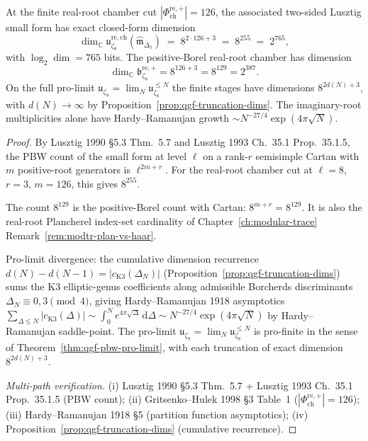 \begin{theorem}
\label{thm:qgf-pbw-closed-126}
At the finite real-root chamber cut
\(|\Phi^{\mathrm{re},+}_{\mathrm{ch}}|=126\), the associated two-sided
Lusztig small form has exact closed-form
dimension
\[
 \boxed{\;
 \dim_{\mathbb C}\mathfrak u_{\zeta_8}^{\mathrm{re},\mathrm{ch}}
 (\widehat{\mathfrak m}_{\Delta_5})
 \;=\;
 8^{2\cdot 126 + 3} \;=\; 8^{255} \;=\; 2^{765},\;}
\]
with $\log_2\dim = 765$ bits. The positive-Borel real-root chamber has
dimension
\[
\dim_{\mathbb C}\mathfrak b_{\zeta_8}^{\mathrm{re},+}
=8^{126+3}=8^{129}=2^{387}.
\]
On the full pro-limit
$\mathfrak u_{\zeta_8} = \lim_N\mathfrak u_{\zeta_8}^{\leq N}$ the
finite stages have dimensions \(8^{2d(N)+3}\), with \(d(N)\to\infty\)
by Proposition~\ref{prop:qgf-truncation-dims}. The imaginary-root
multiplicities alone have Hardy--Ramanujan growth
\(\sim N^{-27/4}\exp(4\pi\sqrt N)\).
\end{theorem}

\begin{proof}
By Lusztig 1990 \S5.3 Thm.~5.7 and Lusztig 1993 Ch.~35.1 Prop.~35.1.5,
the PBW count of the small form at level $\ell$ on a rank-$r$
semisimple Cartan with \(m\) positive-root generators is
\(\ell^{2m+r}\). For the real-root chamber cut at \(\ell=8\),
\(r=3\), \(m=126\), this gives \(8^{255}\).

The count \(8^{129}\) is the positive-Borel count with Cartan:
\(8^{m+r}=8^{129}\). It is also the real-root Plancherel index-set
cardinality of Chapter~\ref{ch:modular-trace}
Remark~\ref{rem:modtr-plan-vs-haar}.

Pro-limit divergence: the cumulative dimension recurrence $d(N) - d(N-1)
= |c_{\mathrm{K3}}(\Delta_N)|$
(Proposition~\ref{prop:qgf-truncation-dims}) sums the K3
elliptic-genus coefficients along admissible Borcherds discriminants
$\Delta_N\equiv 0, 3\pmod 4$, giving Hardy--Ramanujan 1918 asymptotics
$\sum_{\Delta\leq N}|c_{\mathrm{K3}}(\Delta)|\sim \int_0^N
e^{4\pi\sqrt\Delta}\,\mathrm d\Delta \sim N^{-27/4}\exp(4\pi\sqrt N)$
by Hardy--Ramanujan saddle-point. The pro-limit $\mathfrak u_{\zeta_8}
= \lim_N\mathfrak u_{\zeta_8}^{\leq N}$ is pro-finite in the sense of
Theorem~\ref{thm:qgf-pbw-pro-limit}, with each truncation of exact
dimension $8^{2d(N) + 3}$.

\emph{Multi-path verification.}
(i) Lusztig 1990 \S5.3 Thm.~5.7 + Lusztig 1993 Ch.~35.1 Prop.~35.1.5
 (PBW count);
(ii) Gritsenko--Hulek 1998 \S3 Table~1
(\(|\Phi^{\mathrm{re},+}_{\mathrm{ch}}| = 126\));
(iii) Hardy--Ramanujan 1918 \S5 (partition function asymptotics);
(iv) Proposition~\ref{prop:qgf-truncation-dims} (cumulative recurrence).
\end{proof}

